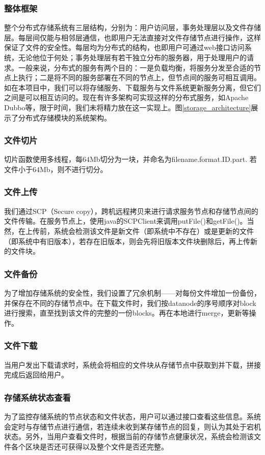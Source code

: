 \documentclass[12pt,a4paper]{article}
\begin{document}
\subsubsection{整体框架}
整个分布式存储系统有三层结构，分别为：用户访问层，事务处理层以及文件存储层。每层间仅能与相邻层通信，也即用户无法直接对文件存储节点进行操作，这样保证了文件的安全性。每层均为分布式的结构，也即用户可通过web接口访问系统，无论他位于何处；事务处理层有若干独立分布的服务器，用于处理用户的请求。一般来说，分布式的服务有两个目的：一是负载均衡，将服务分发至合适的节点上执行；二是将不同的服务部署在不同的节点上，但节点间的服务可相互调用。如在本项目中，我们可以将存储服务、下载服务与文件系统更新服务分离，但它们之间是可以相互访问的。现在有许多架构可实现这样的分布式服务，如Apache Dubbo等，限于时间，我们未将精力放在这一实现上。图\ref{storage_architecture}展示了分布式存储模块的系统架构。
\subsubsection{文件切片}
切片函数使用多线程，每$64$Mb切分为一块，并命名为filename.format.ID.part. 若文件小于$64$Mb，则不进行切分。
\subsubsection{文件上传}
我们通过SCP（Secure copy），跨机远程拷贝来进行请求服务节点和存储节点间的文件传输。在服务节点上，使用java的SCPClient来调用putFile()和getFile()。当然，在上传前，系统会检测该文件是新文件（即系统中不存在）或是更新的文件（即系统中有旧版本），若存在旧版本，则会先将旧版本文件块删除后，再上传新的文件块。
\subsubsection{文件备份}
为了增加存储系统的安全性，我们设置了冗余机制——对每份文件增加一份备份，并保存在不同的存储节点中。在下载文件时，我们按datanode的序号顺序对block进行搜索，直至找到该文件的完整的一份blocks。再在本地进行merge，更新等操作。
\subsubsection{文件下载}
当用户发出下载请求时，系统会将相应的文件块从存储节点中获取到并下载，拼接完成后返回给用户。
\subsubsection{存储系统状态查看}
为了监控存储系统的节点状态和文件状态，用户可以通过接口查看这些信息。系统会定时与存储节点进行通信，若连续未收到某存储节点的回复，则认为其处于宕机状态。另外，当用户查看文件时，根据当前的存储节点健康状况，系统会检测该文件各个区块是否还可获得以及整个文件是否还完整。
\end{document}
